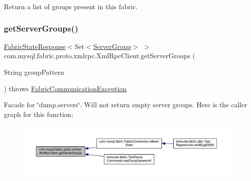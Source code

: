 Return a list of groups present in this fabric. \mbox{\label{classcom_1_1mysql_1_1fabric_1_1proto_1_1xmlrpc_1_1_xml_rpc_client_a4994f6f561120609d2424ac3dd5358e7}} 
\subsubsection{\texorpdfstring{get\+Server\+Groups()}{getServerGroups()}}
{\footnotesize\ttfamily \mbox{\hyperlink{classcom_1_1mysql_1_1fabric_1_1_fabric_state_response}{Fabric\+State\+Response}}$<$Set$<$\mbox{\hyperlink{classcom_1_1mysql_1_1fabric_1_1_server_group}{Server\+Group}}$>$ $>$ com.\+mysql.\+fabric.\+proto.\+xmlrpc.\+Xml\+Rpc\+Client.\+get\+Server\+Groups (\begin{DoxyParamCaption}\item[{String}]{group\+Pattern }\end{DoxyParamCaption}) throws \mbox{\hyperlink{classcom_1_1mysql_1_1fabric_1_1_fabric_communication_exception}{Fabric\+Communication\+Exception}}}

Facade for \char`\"{}dump.\+servers\char`\"{}. Will not return empty server groups. Here is the caller graph for this function\+:\nopagebreak
\begin{figure}[H]
\begin{center}
\leavevmode
\includegraphics[width=350pt]{classcom_1_1mysql_1_1fabric_1_1proto_1_1xmlrpc_1_1_xml_rpc_client_a4994f6f561120609d2424ac3dd5358e7_icgraph}
\end{center}
\end{figure}
\mbox{\label{classcom_1_1mysql_1_1fabric_1_1proto_1_1xmlrpc_1_1_xml_rpc_client_abe45ffddd4ee9cb5dd9aa9a7b38b895c}} 
